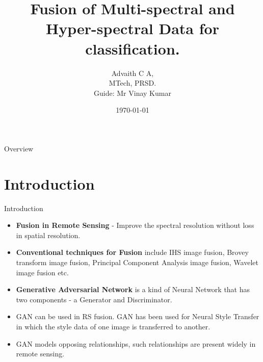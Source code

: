 \documentclass{beamer}
\title[Image Fusion using GAN]{Fusion of Multi-spectral and Hyper-spectral Data for classification.}
\author[Advaith C A]{Advaith C A,\\MTech, PRSD.\\Guide: Mr Vinay Kumar}
\date{\today}
\begin{document}
\begin{frame}
    \maketitle
\end{frame}
\begin{frame}{Overview}
    \hfill
    \parbox[t]{.89\textwidth}{
      \begin{minipage}[c][0.6\textheight]{\textwidth}
      \tableofcontents
      \end{minipage}
    }
\end{frame}
\section{Introduction}
\begin{frame}{Introduction}
    \begin{itemize}
        \item \textbf{Fusion in Remote Sensing} - Improve the spectral resolution without loss in spatial resolution.
        \item \textbf{Conventional techniques for Fusion} include IHS image fusion, Brovey transform image fusion, Principal Component Analysis image fusion, Wavelet image fusion etc.
        \item \textbf{Generative Adversarial Network} is a kind of Neural Network that has two components - a Generator and Discriminator.
        \item GAN can be used in RS fusion. GAN has been used for Neural Style Transfer in which the style data of one image is transferred to another.
        \item GAN models opposing relationships, such relationships are present widely in remote sensing.
    \end{itemize}
\end{frame}
\end{document}

